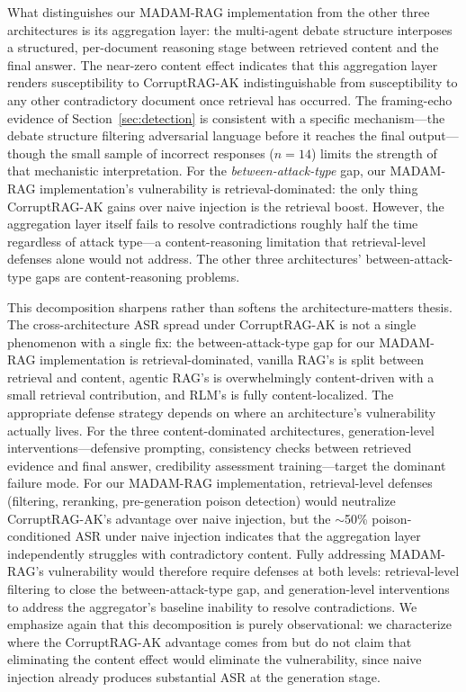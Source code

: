 \documentclass[11pt]{article}
\begin{document}
What distinguishes our MADAM-RAG implementation from the other three architectures is its aggregation layer: the multi-agent debate structure interposes a structured, per-document reasoning stage between retrieved content and the final answer. The near-zero content effect indicates that this aggregation layer renders susceptibility to CorruptRAG-AK indistinguishable from susceptibility to any other contradictory document once retrieval has occurred. The framing-echo evidence of Section~\ref{sec:detection} is consistent with a specific mechanism---the debate structure filtering adversarial language before it reaches the final output---though the small sample of incorrect responses ($n{=}14$) limits the strength of that mechanistic interpretation. For the \emph{between-attack-type} gap, our MADAM-RAG implementation's vulnerability is retrieval-dominated: the only thing CorruptRAG-AK gains over naive injection is the retrieval boost. However, the aggregation layer itself fails to resolve contradictions roughly half the time regardless of attack type---a content-reasoning limitation that retrieval-level defenses alone would not address. The other three architectures' between-attack-type gaps are content-reasoning problems.

This decomposition sharpens rather than softens the architecture-matters thesis. The cross-architecture ASR spread under CorruptRAG-AK is not a single phenomenon with a single fix: the between-attack-type gap for our MADAM-RAG implementation is retrieval-dominated, vanilla RAG's is split between retrieval and content, agentic RAG's is overwhelmingly content-driven with a small retrieval contribution, and RLM's is fully content-localized. The appropriate defense strategy depends on where an architecture's vulnerability actually lives. For the three content-dominated architectures, generation-level interventions---defensive prompting, consistency checks between retrieved evidence and final answer, credibility assessment training---target the dominant failure mode. For our MADAM-RAG implementation, retrieval-level defenses (filtering, reranking, pre-generation poison detection) would neutralize CorruptRAG-AK's advantage over naive injection, but the ${\sim}$50\% poison-conditioned ASR under naive injection indicates that the aggregation layer independently struggles with contradictory content. Fully addressing MADAM-RAG's vulnerability would therefore require defenses at both levels: retrieval-level filtering to close the between-attack-type gap, and generation-level interventions to address the aggregator's baseline inability to resolve contradictions. We emphasize again that this decomposition is purely observational: we characterize where the CorruptRAG-AK advantage comes from but do not claim that eliminating the content effect would eliminate the vulnerability, since naive injection already produces substantial ASR at the generation stage.
\end{document}
